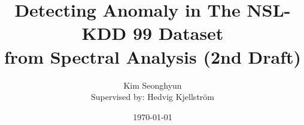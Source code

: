 \title{Detecting Anomaly in The NSL-KDD 99 Dataset \\ from Spectral Analysis (2nd Draft)}

\author{Kim Seonghyun \\{\small Supervised by: Hedvig Kjellstr\"{o}m}}

\date{\today}
